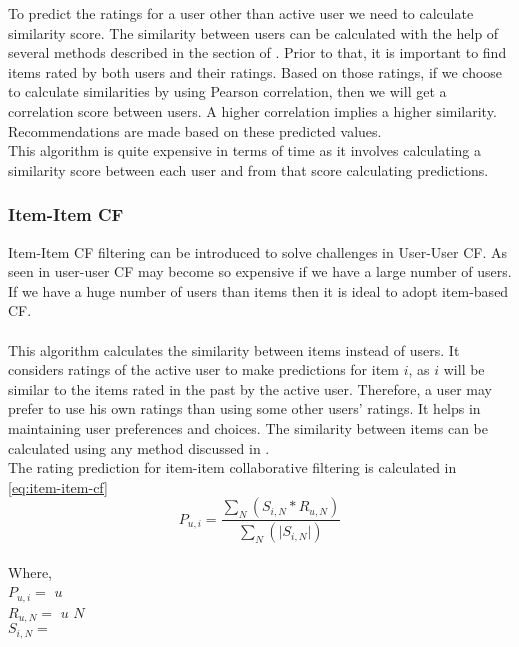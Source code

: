 \noindent To predict the ratings for a user other than active user we need to calculate similarity score. The similarity between users can be calculated with the help of several methods described in the section of . Prior to that, it is important to find items rated by both users and their ratings. Based on those ratings, if we choose to calculate similarities by using Pearson correlation, then we will get a correlation score between users. A higher correlation implies a higher similarity. Recommendations are made based on these predicted values. 
\\
This algorithm is quite expensive in terms of time as it involves calculating a similarity score between each user and from that score calculating predictions. 
\\

\subsubsection{Item-Item CF}

Item-Item CF filtering can be introduced to solve challenges in User-User CF. As seen in user-user CF may become so expensive if we have a large number of users. If we have a huge number of users than items then it is ideal to adopt item-based CF.
\\
\\
This algorithm calculates the similarity between items instead of users. It considers ratings of the active user to make predictions for item $i$, as $i$ will be similar to the items rated in the past by the active user. Therefore, a user may prefer to use his own ratings than using some other users' ratings. It helps in maintaining user preferences and choices. The similarity between items can be calculated using any method discussed in .
\\
The rating prediction for item-item collaborative filtering is calculated in \autoref{eq:item-item-cf}
\begin{equation}
P_{u,i} = \frac { \sum_N(S_{i,N} * R_{u,N})}{\sum_N (\vert S_{i,N} \vert)}
\label{eq:item-item-cf}
\end{equation}
\\
Where, 
\\
\noindent
$P_{u,i} = $  $u$ 
\\
$R_{u,N} = $  $u$  $N$ 
\\
$S_{i,N} = $ 
\\
\\

